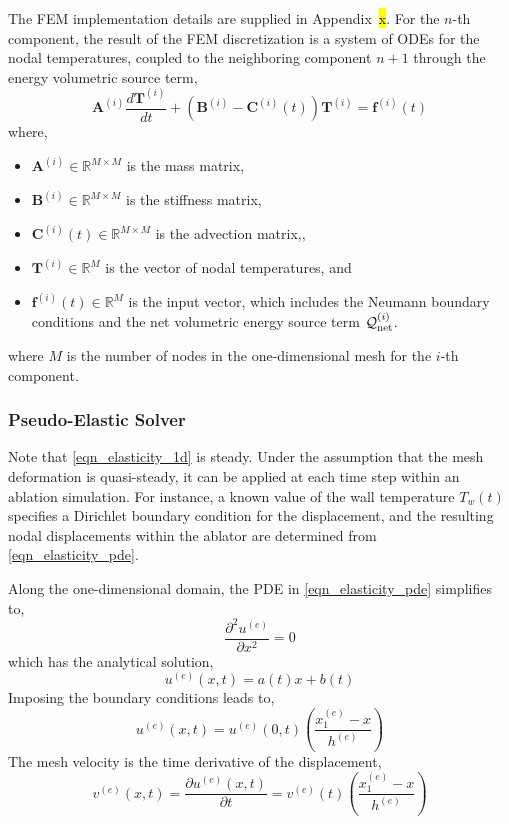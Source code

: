 The FEM implementation details are supplied in Appendix~\hl{x}. For the $n$-th component, the result of the FEM discretization is a system of ODEs for the nodal temperatures, coupled to the neighboring component $n+1$ through the energy volumetric source term,
\begin{equation}
    \mathbf{A}^{(i)}\frac{d\mathbf{T}^{(i)}}{dt} + \left(\mathbf{B}^{(i)} - \mathbf{C}^{(i)}(t)\right)\mathbf{T}^{(i)} = \mathbf{f}^{(i)}(t)
\end{equation}
where,
\begin{itemize}
    \item $\mathbf{A}^{(i)}\in\mathbb{R}^{M\times M}$ is the mass matrix,
    \item $\mathbf{B}^{(i)}\in\mathbb{R}^{M\times M}$ is the stiffness matrix,
    \item $\mathbf{C}^{(i)}(t)\in\mathbb{R}^{M\times M}$ is the advection matrix,,
    \item $\mathbf{T}^{(i)}\in\mathbb{R}^{M}$ is the vector of nodal temperatures, and
    \item $\mathbf{f}^{(i)}(t)\in\mathbb{R}^{M}$ is the input vector, which includes the Neumann boundary conditions and the net volumetric energy source term $\mathcal{Q}^{(i)}_{\text{net}}$.
\end{itemize}
where $M$ is the number of nodes in the one-dimensional mesh for the $i$-th component.

\subsubsection{Pseudo-Elastic Solver}

Note that \cref{eqn_elasticity_1d} is steady. Under the assumption that the mesh deformation is quasi-steady, it can be applied at each time step within an ablation simulation. For instance, a known value of the wall temperature $T_w(t)$ specifies a Dirichlet boundary condition for the displacement, and the resulting nodal displacements within the ablator are determined from \cref{eqn_elasticity_pde}.

Along the one-dimensional domain, the PDE in \cref{eqn_elasticity_pde} simplifies to,
\begin{equation}
    \frac{\partial^2 u^{(e)}}{\partial x^2} = 0
\end{equation}
which has the analytical solution,
\begin{equation}
    u^{(e)}(x,t) = a(t)x + b(t)
\end{equation}
Imposing the boundary conditions leads to,
\begin{equation}
    u^{(e)}(x,t) = u^{(e)}(0,t)\left(\frac{x_1^{(e)} - x}{h^{(e)}}\right)
\end{equation}
The mesh velocity is the time derivative of the displacement,
\begin{equation}
    v^{(e)}(x,t) = \frac{\partial u^{(e)}(x,t)}{\partial t} = v^{(e)}(t)\left(\frac{x_1^{(e)} - x}{h^{(e)}}\right)
\end{equation}

